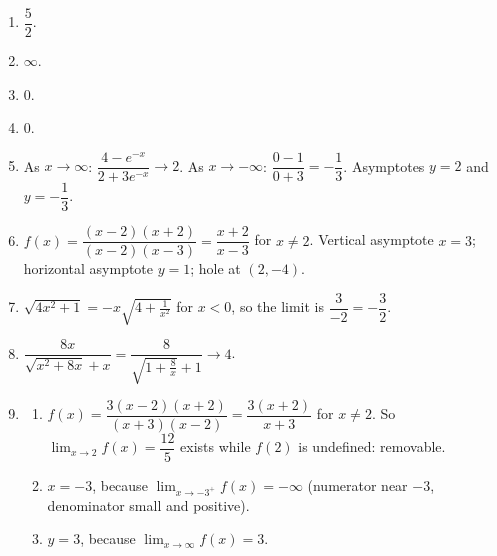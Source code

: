 \documentclass[11pt]{article}
\begin{document}
\newpage
\begin{solbox}
\begin{enumerate}[leftmargin=*,itemsep=4pt]
  \item $\dfrac52$.
  \item $\infty$.
  \item $0$.
  \item $0$.
  \item As $x\to\infty$: $\dfrac{4-e^{-x}}{2+3e^{-x}}\to2$. As $x\to-\infty$: $\dfrac{0-1}{0+3}=-\dfrac13$. Asymptotes $y=2$ and $y=-\dfrac13$.
  \item $f(x)=\dfrac{(x-2)(x+2)}{(x-2)(x-3)}=\dfrac{x+2}{x-3}$ for $x\neq2$. Vertical asymptote $x=3$; horizontal asymptote $y=1$; hole at $(2,-4)$.
  \item $\sqrt{4x^2+1}=-x\sqrt{4+\tfrac1{x^2}}$ for $x<0$, so the limit is $\dfrac{3}{-2}=-\dfrac32$.
  \item $\dfrac{8x}{\sqrt{x^2+8x}+x}=\dfrac{8}{\sqrt{1+\frac8x}+1}\to4$.
  \item \begin{enumerate}[label=(\alph*),leftmargin=*,itemsep=3pt]
    \item $f(x)=\dfrac{3(x-2)(x+2)}{(x+3)(x-2)}=\dfrac{3(x+2)}{x+3}$ for $x\neq2$. So $\displaystyle\lim_{x\to 2}f(x)=\dfrac{12}{5}$ exists while $f(2)$ is undefined: removable.
    \item $x=-3$, because $\displaystyle\lim_{x\to -3^+}f(x)=-\infty$ (numerator near $-3$, denominator small and positive).
    \item $y=3$, because $\displaystyle\lim_{x\to \infty}f(x)=3$.
  \end{enumerate}
\end{enumerate}
\end{solbox}
\end{document}
